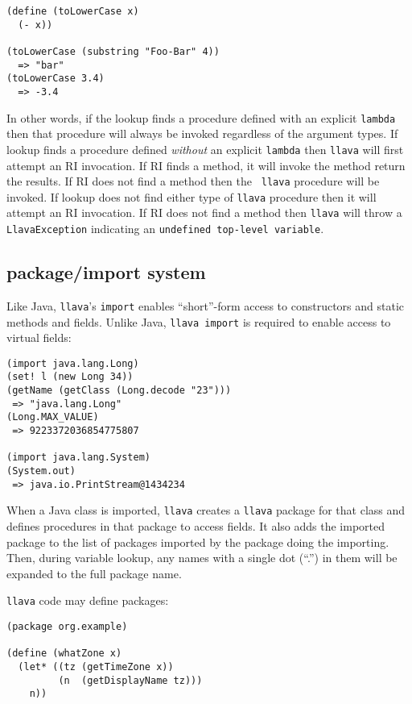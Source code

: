\documentclass{acm-final/sig-alternate-modified}
\begin{document}
\small
\begin{verbatim}
(define (toLowerCase x)
  (- x))

(toLowerCase (substring "Foo-Bar" 4))
  => "bar"
(toLowerCase 3.4)
  => -3.4
\end{verbatim}
\normalsize

In other words, if the lookup finds a procedure defined with an
explicit {\tt lambda} then that procedure will always be invoked
regardless of the argument types.  If lookup finds a procedure defined
\emph{without} an explicit {\tt lambda} then {\tt llava} will first
attempt an RI invocation.  If RI finds a method, it will invoke the
method return the results.  If RI does not find a method then the {\tt
llava} procedure will be invoked.  If lookup does not find either type
of {\tt llava} procedure then it will attempt an RI invocation.  If RI
does not find a method then {\tt llava} will throw a {\tt
LlavaException} indicating an {\tt undefined top-level variable}.

\subsection{package/import system}

Like Java, {\tt llava}'s {\tt import} enables ``short''-form access to
constructors and static methods and fields.  Unlike Java, {\tt llava
import} is required to enable access to virtual fields:

\small
\begin{verbatim}
(import java.lang.Long)
(set! l (new Long 34))
(getName (getClass (Long.decode "23")))
 => "java.lang.Long"
(Long.MAX_VALUE)
 => 9223372036854775807

(import java.lang.System)
(System.out)
 => java.io.PrintStream@1434234
\end{verbatim}
\normalsize

When a Java class is imported, {\tt llava} creates a {\tt llava}
package for that class and defines procedures in that package to
access fields.  It also adds the imported package to the list of
packages imported by the package doing the importing.  Then, during
variable lookup, any names with a single dot (``.'') in them will be
expanded to the full package name.


{\tt llava} code may define packages:

\small
\begin{verbatim}
(package org.example)

(define (whatZone x)
  (let* ((tz (getTimeZone x))
         (n  (getDisplayName tz)))
    n))
\end{verbatim}
\normalsize
\end{document}
